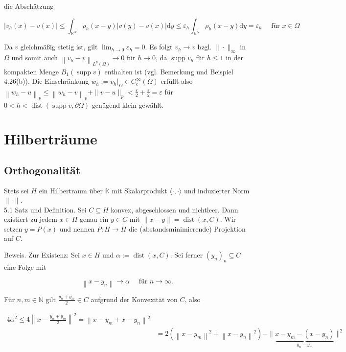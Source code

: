 \documentclass[10pt, letterpaper]{article}
\begin{document}
die Abschätzung

$$
\left|v_{h}(x)-v(x)\right| \leq \int_{\mathbb{R}^{N}} \rho_{h}(x-y)|v(y)-v(x)| \mathrm{d} y \leq \varepsilon_{h} \int_{\mathbb{R}^{N}} \rho_{h}(x-y) \mathrm{d} y=\varepsilon_{h} \quad \text { für } x \in \Omega
$$

Da $v$ gleichmäßig stetig ist, gilt $\lim _{h \rightarrow 0} \varepsilon_{h}=0$. Es folgt $v_{h} \rightarrow v$ bzgl. $\|\cdot\|_{\infty}$ in $\Omega$ und somit auch $\left\|v_{h}-v\right\|_{L^{p}(\Omega)} \rightarrow 0$ für $h \rightarrow 0$, da $\operatorname{supp} v_{h}$ für $h \leq 1$ in der kompakten Menge $B_{1}(\operatorname{supp} v)$ enthalten ist (vgl. Bemerkung und Beispiel 4.26(b)). Die Einschränkung $w_{h}:=\left.v_{h}\right|_{\Omega} \in C_{\mathrm{c}}^{\infty}(\Omega)$ erfüllt also $\left\|w_{h}-u\right\|_{p} \leq\left\|w_{h}-v\right\|_{p}+\|v-u\|_{p}<\frac{\varepsilon}{2}+\frac{\varepsilon}{2}=\varepsilon$ für $0<h<\operatorname{dist}(\operatorname{supp} v, \partial \Omega)$ genügend klein gewählt.

\section*{Hilberträume}
\subsection*{Orthogonalität}
Stets sei $H$ ein Hilbertraum über $\mathbb{K}$ mit Skalarprodukt $\langle\cdot, \cdot\rangle$ und induzierter Norm $\|\cdot\|$.\\
5.1 Satz und Definition. Sei $C \subseteq H$ konvex, abgeschlossen und nichtleer. Dann existiert zu jedem $x \in H$ genau ein $y \in C$ mit $\|x-y\|=\operatorname{dist}(x, C)$. Wir setzen $y=P(x)$ und nennen $P: H \rightarrow H$ die (abstandsminimierende) Projektion auf $C$.

Beweis. Zur Existenz: Sei $x \in H$ und $\alpha:=\operatorname{dist}(x, C)$. Sei ferner $\left(y_{n}\right)_{n} \subseteq C$ eine Folge mit

$$
\left\|x-y_{n}\right\| \rightarrow \alpha \quad \text { für } n \rightarrow \infty .
$$

Für $n, m \in \mathbb{N}$ gilt $\frac{y_{n}+y_{m}}{2} \in C$ aufgrund der Konvexität von $C$, also

$$
\begin{aligned}
4 \alpha^{2} \leq 4\left\|x-\frac{y_{n}+y_{m}}{2}\right\|^{2}=\left\|x-y_{m}+x-y_{n}\right\|^{2} & \\
& =2\left(\left\|x-y_{m}\right\|^{2}+\left\|x-y_{n}\right\|^{2}\right)-\|\underbrace{x-y_{m}-\left(x-y_{n}\right)}_{y_{n}-y_{m}}\|^{2}
\end{aligned}
$$
\end{document}
